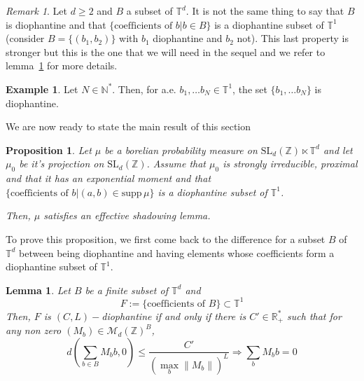 \documentclass[11pt]{amsart}
\newtheorem{lemma}[theorem]{Lemma}
\newtheorem{proposition}[theorem]{Proposition}
\theoremstyle{definition}
\newtheorem{example}[theorem]{Example}
\theoremstyle{remark}
\newtheorem{remark}[theorem]{Remark}
\numberwithin{equation}{section}
\begin{document}
\begin{remark}
Let $d\geqslant 2$ and $B$ a subset of ${\mathbb T}^d$. It is not the same thing to say that $B$ is diophantine and that $\{\text{coefficients of }b| b\in B\}$ is a diophantine subset of ${\mathbb T}^1$ (consider $B=\{(b_1,b_2)\}$ with $b_1$ diophantine and $b_2$ not). This last property is stronger but this is the one that we will need in the sequel and we refer to lemma~\ref{lemma:equivalence_defi_diophantiennes} for more details.
\end{remark}

\begin{example} \label{example:diophantien_generique}
Let $N\in {\mathbb N}^\ast$. Then, for a.e. $b_1, \dots b_N\in {\mathbb T}^1$, the set $\{b_1, \dots b_N\}$ is diophantine.
\end{example}

We are now ready to state the main result of this section
\begin{proposition} \label{proposition:critere_diophantien}
Let $\mu$ be a borelian probability measure on $\mathrm{SL}_d({\mathbb Z}) \ltimes {\mathbb T}^d$ and let $\mu_0$ be it's projection on $\mathrm{SL}_d({\mathbb Z})$. Assume that $\mu_0$ is strongly irreducible, proximal and that it has an exponential moment and that $\{\text{coefficients of }b| (a,b)\in {\mathrm{supp}\,}\mu\}$ is a diophantine subset of ${\mathbb T}^1$.

Then, $\mu$ satisfies an effective shadowing lemma.
\end{proposition}

To prove this proposition, we first come back to the difference for a subset $B$ of ${\mathbb T}^d$ between being diophantine and having elements whose coefficients form a diophantine subset of ${\mathbb T}^1$.

\begin{lemma} \label{lemma:equivalence_defi_diophantiennes}
Let $B $ be a finite subset of $ {\mathbb T}^d$ and
\[
F:= \{ \text{coefficients of }B\} \subset {\mathbb T}^1
\]
Then, $F$ is $(C,L)-$diophantine if and only if there is $C'\in {\mathbb R}_+^\ast$ such that for any non zero $(M_b) \in \mathcal{M}_d({\mathbb Z})^B$,
\[
d\left(\sum_{b\in B} M_b b,0\right) \leqslant \frac{C'}{(\max_b \|M_b\|)^L} \Rightarrow \sum_b M_bb=0
\]
\end{lemma}
\end{document}
